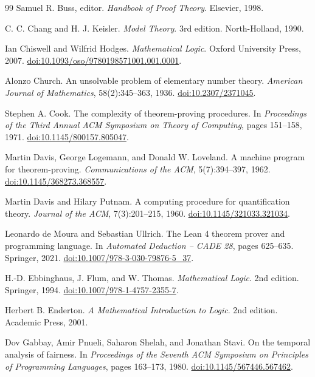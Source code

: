 \documentclass[11pt,oneside,openany]{book}
\theoremstyle{definition}
\theoremstyle{plain}
\theoremstyle{remark}
\begin{document}
\begin{thebibliography}{99}
Samuel R. Buss, editor.
\emph{Handbook of Proof Theory}.
Elsevier, 1998.

C. C. Chang and H. J. Keisler.
\emph{Model Theory}. 3rd edition.
North-Holland, 1990.

Ian Chiswell and Wilfrid Hodges.
\emph{Mathematical Logic}.
Oxford University Press, 2007.
\href{https://doi.org/10.1093/oso/9780198571001.001.0001}{doi:10.1093/oso/9780198571001.001.0001}.

Alonzo Church.
An unsolvable problem of elementary number theory.
\emph{American Journal of Mathematics}, 58(2):345--363, 1936.
\href{https://doi.org/10.2307/2371045}{doi:10.2307/2371045}.

Stephen A. Cook.
The complexity of theorem-proving procedures.
In \emph{Proceedings of the Third Annual ACM Symposium on Theory of Computing},
pages 151--158, 1971.
\href{https://doi.org/10.1145/800157.805047}{doi:10.1145/800157.805047}.

Martin Davis, George Logemann, and Donald W. Loveland.
A machine program for theorem-proving.
\emph{Communications of the ACM}, 5(7):394--397, 1962.
\href{https://doi.org/10.1145/368273.368557}{doi:10.1145/368273.368557}.

Martin Davis and Hilary Putnam.
A computing procedure for quantification theory.
\emph{Journal of the ACM}, 7(3):201--215, 1960.
\href{https://doi.org/10.1145/321033.321034}{doi:10.1145/321033.321034}.

Leonardo de Moura and Sebastian Ullrich.
The Lean 4 theorem prover and programming language.
In \emph{Automated Deduction -- CADE 28}, pages 625--635. Springer, 2021.
\href{https://doi.org/10.1007/978-3-030-79876-5_37}{doi:10.1007/978-3-030-79876-5\_37}.

H.-D. Ebbinghaus, J. Flum, and W. Thomas.
\emph{Mathematical Logic}. 2nd edition.
Springer, 1994.
\href{https://doi.org/10.1007/978-1-4757-2355-7}{doi:10.1007/978-1-4757-2355-7}.

Herbert B. Enderton.
\emph{A Mathematical Introduction to Logic}. 2nd edition.
Academic Press, 2001.

Dov Gabbay, Amir Pnueli, Saharon Shelah, and Jonathan Stavi.
On the temporal analysis of fairness.
In \emph{Proceedings of the Seventh ACM Symposium on Principles of
Programming Languages}, pages 163--173, 1980.
\href{https://doi.org/10.1145/567446.567462}{doi:10.1145/567446.567462}.


\end{thebibliography}
\end{document}
